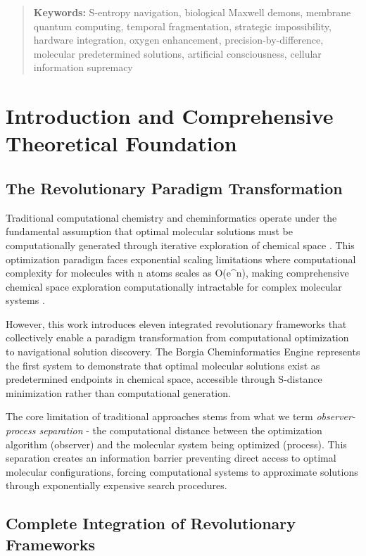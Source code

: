 \documentclass[11pt,a4paper]{article}
\begin{document}
\begin{abstract}
\textbf{Keywords:} S-entropy navigation, biological Maxwell demons, membrane quantum computing, temporal fragmentation, strategic impossibility, hardware integration, oxygen enhancement, precision-by-difference, molecular predetermined solutions, artificial consciousness, cellular information supremacy

\end{abstract}

\section{Introduction and Comprehensive Theoretical Foundation}

\subsection{The Revolutionary Paradigm Transformation}

Traditional computational chemistry and cheminformatics operate under the fundamental assumption that optimal molecular solutions must be computationally generated through iterative exploration of chemical space \cite{reymond2015chemical, walters2020virtual}. This optimization paradigm faces exponential scaling limitations where computational complexity for molecules with n atoms scales as O(e^n), making comprehensive chemical space exploration computationally intractable for complex molecular systems \cite{bohacek1996art}.

However, this work introduces eleven integrated revolutionary frameworks that collectively enable a paradigm transformation from computational optimization to navigational solution discovery. The Borgia Cheminformatics Engine represents the first system to demonstrate that optimal molecular solutions exist as predetermined endpoints in chemical space, accessible through S-distance minimization rather than computational generation.

The core limitation of traditional approaches stems from what we term \textit{observer-process separation} - the computational distance between the optimization algorithm (observer) and the molecular system being optimized (process). This separation creates an information barrier preventing direct access to optimal molecular configurations, forcing computational systems to approximate solutions through exponentially expensive search procedures.

\subsection{Complete Integration of Revolutionary Frameworks}
\end{document}
